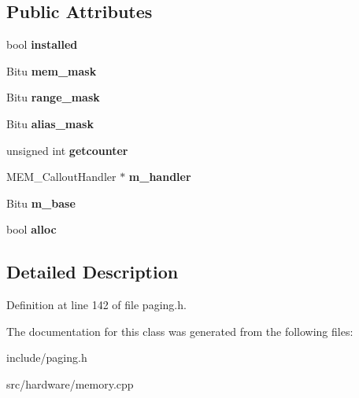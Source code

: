 \subsection*{Public Attributes}
\begin{DoxyCompactItemize}
\item 
\hypertarget{classMEM__CalloutObject_a7b541b8ebca7dc3f4d270ed3b452e728}{bool {\bfseries installed}}\label{classMEM__CalloutObject_a7b541b8ebca7dc3f4d270ed3b452e728}

\item 
\hypertarget{classMEM__CalloutObject_a4e9e808b42695910067942ba96910a4a}{Bitu {\bfseries mem\-\_\-mask}}\label{classMEM__CalloutObject_a4e9e808b42695910067942ba96910a4a}

\item 
\hypertarget{classMEM__CalloutObject_abf0675214f67f07ed55398b4f3134c52}{Bitu {\bfseries range\-\_\-mask}}\label{classMEM__CalloutObject_abf0675214f67f07ed55398b4f3134c52}

\item 
\hypertarget{classMEM__CalloutObject_a9943a9b012fbe4062165212e82eb9a40}{Bitu {\bfseries alias\-\_\-mask}}\label{classMEM__CalloutObject_a9943a9b012fbe4062165212e82eb9a40}

\item 
\hypertarget{classMEM__CalloutObject_a7c878c0fd1220ff368d99f711ddfc72b}{unsigned int {\bfseries getcounter}}\label{classMEM__CalloutObject_a7c878c0fd1220ff368d99f711ddfc72b}

\item 
\hypertarget{classMEM__CalloutObject_a3c74b9fe23f7c0c1f2509af29527fc02}{M\-E\-M\-\_\-\-Callout\-Handler $\ast$ {\bfseries m\-\_\-handler}}\label{classMEM__CalloutObject_a3c74b9fe23f7c0c1f2509af29527fc02}

\item 
\hypertarget{classMEM__CalloutObject_ac31010e57ee064b986e747a978bdb093}{Bitu {\bfseries m\-\_\-base}}\label{classMEM__CalloutObject_ac31010e57ee064b986e747a978bdb093}

\item 
\hypertarget{classMEM__CalloutObject_ab0bd7d892bbbe4ae49e5a0e40812fc61}{bool {\bfseries alloc}}\label{classMEM__CalloutObject_ab0bd7d892bbbe4ae49e5a0e40812fc61}

\end{DoxyCompactItemize}


\subsection{Detailed Description}


Definition at line 142 of file paging.\-h.



The documentation for this class was generated from the following files\-:\begin{DoxyCompactItemize}
\item 
include/paging.\-h\item 
src/hardware/memory.\-cpp\end{DoxyCompactItemize}
